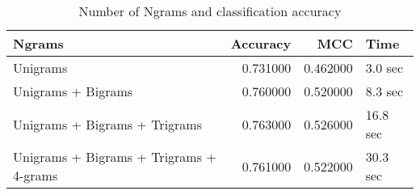 \begin{table}
\caption{Number of Ngrams and classification accuracy}
\label{tab:ngrams}
\begin{tabular}{lrrl}
\toprule
Ngrams & Accuracy & MCC & Time \\
\midrule
Unigrams & 0.731000 & 0.462000 & 3.0 sec \\
Unigrams + Bigrams & 0.760000 & 0.520000 & 8.3 sec \\
Unigrams + Bigrams + Trigrams & 0.763000 & 0.526000 & 16.8 sec \\
Unigrams + Bigrams + Trigrams + 4-grams & 0.761000 & 0.522000 & 30.3 sec \\
\bottomrule
\end{tabular}
\end{table}
